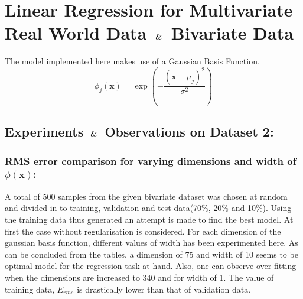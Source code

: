 \section{Linear Regression for Multivariate Real World Data  $\And$ Bivariate Data}
The model implemented here makes use of a Gaussian Basis Function,
\begin{equation*}
    \mathbb{\phi}_j(\mathbf{x}) = \exp \left( {-\frac{(\mathbf{x} - \mu_j)^2}{\sigma^2}} \right)
\end{equation*}

\subsection{Experiments $\And$ Observations on Dataset 2:}

\subsubsection{RMS error comparison for varying dimensions and width of $\mathbb{\phi}(\mathbf{x})$:}

A total of 500 samples from the given bivariate dataset was chosen at random and divided in to training, validation and test data(70$\%$, 20$\%$ and 10$\%$). Using the training data thus generated an attempt is made to find the best model. At first the case without regularisation is considered. For each dimension of the gaussian basis function, different values of width has been experimented here. As can be concluded from the tables, a dimension of 75 and width of 10 seems to be optimal model for the regression task at hand. Also, one can observe over-fitting when the dimensions are increased to 340 and for width of 1. The value of training data, $E_{rms}$ is drastically lower than that of validation data.

